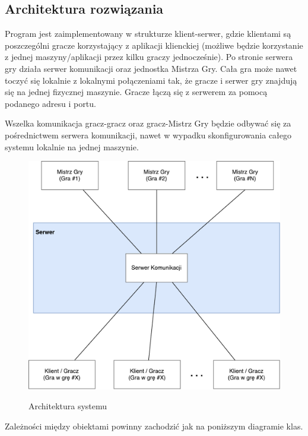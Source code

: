 \documentclass[11pt]{article}
\let\Oldsubsection\subsection
\renewcommand{\subsection}{\FloatBarrier\Oldsubsection}
\begin{document}
\subsection{Architektura rozwiązania}
\par
Program jest zaimplementowany w strukturze klient-serwer, gdzie klientami są poszczególni gracze korzystający z aplikacji klienckiej (możliwe będzie korzystanie z jednej maszyny/aplikacji przez kilku graczy jednocześnie). Po stronie serwera gry działa serwer komunikacji oraz jednostka Mistrza Gry. Cała gra może nawet toczyć się lokalnie z lokalnymi połączeniami tak, że gracze i serwer gry znajdują się na jednej fizycznej maszynie. Gracze łączą się z serwerem za pomocą podanego adresu i portu.
\par
Wszelka komunikacja gracz-gracz oraz gracz-Mistrz Gry będzie odbywać się za pośrednictwem serwera komunikacji, nawet w wypadku skonfigurowania całego systemu lokalnie na jednej maszynie.

\begin{figure}[!h]
\caption{Architektura systemu}
\resizebox{\textwidth}{!}
{
\includegraphics{../res/architecture}
}
\end{figure}
\FloatBarrier

\par
Zależności między obiektami powinny zachodzić jak na poniższym diagramie klas.
\end{document}
